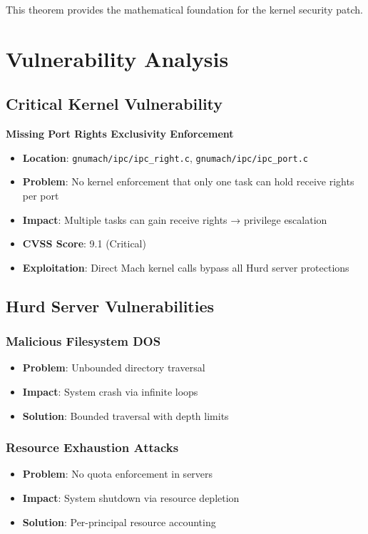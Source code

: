 \documentclass[11pt,a4paper]{article}
\begin{document}
This theorem provides the mathematical foundation for the kernel security patch.

\section{Vulnerability Analysis}

\subsection{Critical Kernel Vulnerability}

\textbf{Missing Port Rights Exclusivity Enforcement}

\begin{itemize}
    \item \textbf{Location}: \texttt{gnumach/ipc/ipc\_right.c}, \texttt{gnumach/ipc/ipc\_port.c}
    \item \textbf{Problem}: No kernel enforcement that only one task can hold receive rights per port
    \item \textbf{Impact}: Multiple tasks can gain receive rights → privilege escalation
    \item \textbf{CVSS Score}: \textcolor{criticalred}{9.1 (Critical)}
    \item \textbf{Exploitation}: Direct Mach kernel calls bypass all Hurd server protections
\end{itemize}

\subsection{Hurd Server Vulnerabilities}

\subsubsection{Malicious Filesystem DOS}
\begin{itemize}
    \item \textbf{Problem}: Unbounded directory traversal
    \item \textbf{Impact}: System crash via infinite loops
    \item \textbf{Solution}: Bounded traversal with depth limits
\end{itemize}

\subsubsection{Resource Exhaustion Attacks}
\begin{itemize}
    \item \textbf{Problem}: No quota enforcement in servers
    \item \textbf{Impact}: System shutdown via resource depletion
    \item \textbf{Solution}: Per-principal resource accounting
\end{itemize}
\end{document}

